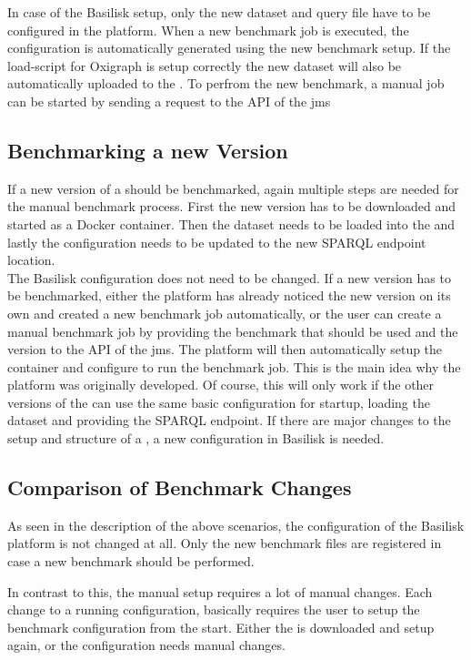 In case of the Basilisk setup, only the new dataset and query file have to be configured in the platform.
When a new benchmark job is executed, the \iguana{} configuration is automatically generated using the new benchmark setup.
If the load-script for Oxigraph is setup correctly the new dataset will also be automatically uploaded to the \ts{}.
To perfrom the new benchmark, a manual job can be started by sending a request to the API of the \ac{jms}


\subsection{Benchmarking a new Version}
If a new version of a \ts{} should be benchmarked, again multiple steps are needed for the manual benchmark process.
First the new version has to be downloaded and started as a Docker container.
Then the dataset needs to be loaded into the \ts{} and lastly the \iguana{} configuration needs to be updated to the new SPARQL endpoint location.
\\

The Basilisk configuration does not need to be changed.
If a new version has to be benchmarked, either the platform has already noticed the new version on its own and created a new benchmark job automatically, or the user can create a manual benchmark job by providing the benchmark that should be used and the \ts{} version to the API of the \ac{jms}.
The platform will then automatically setup the container and configure \iguana{} to run the benchmark job.
This is the main idea why the platform was originally developed.
Of course, this will only work if the other versions of the \ts{} can use the same basic configuration for startup, loading the dataset and providing the SPARQL endpoint.
If there are major changes to the setup and structure of a \ts{}, a new configuration in Basilisk is needed.


\subsection{Comparison of Benchmark Changes}
As seen in the description of the above scenarios, the \ts{} configuration of the Basilisk platform is not changed at all.
Only the new benchmark files are registered in case a new benchmark should be performed.

In contrast to this, the manual setup requires a lot of manual changes.
Each change to a running configuration, basically requires the user to setup the benchmark configuration from the start.
Either the \ts{} is downloaded and setup again, or the \iguana{} configuration needs manual changes.


